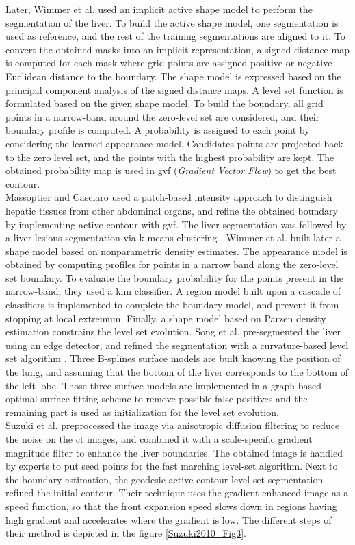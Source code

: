 Later, Wimmer et al. \cite{Wimmer2008} used an implicit active shape model to perform the
segmentation of the liver. To build the active shape model, one
segmentation is used as reference, and the rest of the training
segmentations are aligned to it. To convert the obtained masks into an
implicit representation, a signed distance map is computed for each mask
where grid points are assigned positive or negative Euclidean distance
to the boundary. The shape model is expressed based on the principal
component analysis of the signed distance maps. A level set function is
formulated based on the given shape model. To build the boundary, all
grid points in a narrow-band around the zero-level set are considered,
and their boundary profile is computed. A probability is assigned to
each point by considering the learned appearance model. Candidates
points are projected back to the zero level set, and the points with the
highest probability are kept. The obtained probability map is used in
\ac{gvf} (\emph{Gradient Vector Flow}) to get the best contour.\\
Massoptier and Casciaro used a patch-based intensity approach to distinguish
hepatic tissues from other abdominal organs, and refine the obtained
boundary by implementing active contour with \ac{gvf}. The liver segmentation
was followed by a liver lesions segmentation via k-means clustering \cite{Massoptier2008}. Wimmer et al. \cite{Wimmer2009} built later a shape model based on nonparametric density
estimates. The appearance model is obtained by computing profiles for
points in a narrow band along the zero-level set boundary. To evaluate
the boundary probability for the points present in the narrow-band, they
used a \ac{knn} classifier. A region model built upon a cascade of
classifiers is implemented to complete the boundary model, and prevent
it from stopping at local extremum. Finally, a shape model based on Parzen
density estimation constrains the level set evolution. Song et al. \cite{Song2009} pre-segmented the liver using an edge detector, and
refined the segmentation with a curvature-based level set algorithm .
Three B-splines surface models are built knowing the position of the
lung, and assuming that the bottom of the liver corresponds to the
bottom of the left lobe. Those three surface models are implemented in a
graph-based optimal surface fitting scheme to remove possible false
positives and the remaining part is used as initialization for the level
set evolution.\\
Suzuki et al. \cite{Suzuki2010} preprocessed the image via anisotropic diffusion
filtering to reduce the noise on the \ac{ct} images, and combined it with a
scale-specific gradient magnitude filter to enhance the liver
boundaries. The obtained image is handled by experts to put seed points
for the fast marching level-set algorithm. Next to the boundary
estimation, the geodesic active contour level set segmentation refined
the initial contour. Their technique uses the gradient-enhanced image as
a speed function, so that the front expansion speed slows down in
regions having high gradient and accelerates where the gradient is low.
The different steps of their method is depicted in the figure \ref{Suzuki2010_Fig3}.

